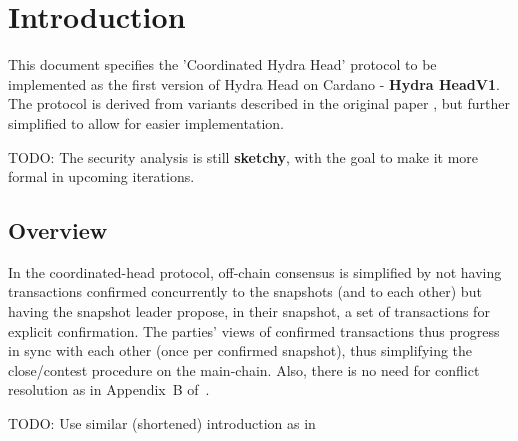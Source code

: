 \section{Introduction}
This document specifies the 'Coordinated Hydra Head' protocol to be implemented as the first version of Hydra Head on Cardano - \textbf{Hydra HeadV1}. The protocol is derived from variants described in the original paper \cite{hydrahead20}, but further simplified to allow for easier implementation.

TODO: The security analysis is still \textbf{sketchy}, with the goal to make it more formal in upcoming
iterations.

\subsection{Overview}
In the coordinated-head protocol, off-chain consensus is simplified by not having transactions
confirmed concurrently to the snapshots (and to each other) but having the snapshot leader propose,
in their snapshot, a set of transactions for explicit confirmation. The parties' views of confirmed
transactions thus progress in sync with each other (once per confirmed snapshot), thus simplifying
the close/contest procedure on the main-chain. Also, there is no need for conflict resolution as
in Appendix~B of~\cite{hydrahead20}.

TODO: Use similar (shortened) introduction as in \cite{hydrahead20}